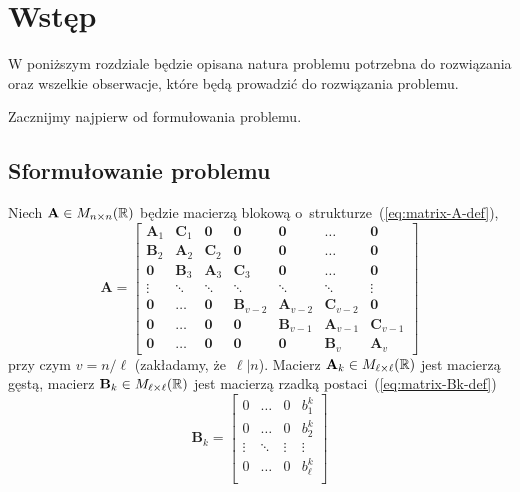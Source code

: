 \documentclass[../main.tex]{subfiles}
\newcommand{\Zero}{\mathbf{0}}
\newcommand{\AAA}{\mathbf{A}}
\newcommand{\BBB}{\mathbf{B}}
\newcommand{\CCC}{\mathbf{C}}
\begin{document}
  \chapter{Wstęp}
  W poniższym rozdziale będzie opisana natura problemu potrzebna do rozwiązania
  oraz wszelkie obserwacje, które będą prowadzić do rozwiązania problemu.
  
  Zacznijmy najpierw od formułowania problemu.
  \section{Sformułowanie problemu}
    Niech \( \AAA \in M_{n \times n}(\RR) \) będzie macierzą blokową
    o~strukturze~(\ref{eq:matrix-A-def}),
    \begin{equation} \label{eq:matrix-A-def}
      \AAA = \begin{bmatrix}
        \AAA_1 & \CCC_1 & \Zero  & \Zero      & \Zero       & \hdots      & \Zero       \\
        \BBB_2 & \AAA_2 & \CCC_2 & \Zero      & \Zero       & \hdots      & \Zero       \\
        \Zero  & \BBB_3 & \AAA_3 & \CCC_3     & \Zero       & \hdots      & \Zero       \\
        \vdots & \ddots & \ddots & \ddots     & \ddots      & \ddots      & \vdots      \\
        \Zero  & \hdots & \Zero  & \BBB_{v-2} & \AAA_{v-2}  & \CCC_{v-2}  & \Zero       \\
        \Zero  & \hdots & \Zero  & \Zero      & \BBB_{v-1}  & \AAA_{v-1}  & \CCC_{v-1}  \\
        \Zero  & \hdots & \Zero  & \Zero      & \Zero       & \BBB_v      & \AAA_v
      \end{bmatrix}
    \end{equation}
    przy czym \( v = n / \ell \) (zakładamy, że~\( \ell | n \)).
    Macierz \( \AAA_k \in M_{\ell \times \ell}(\RR) \) jest macierzą gęstą,
    macierz \( \BBB_k \in M_{\ell \times \ell}(\RR) \) jest macierzą rzadką
    postaci~(\ref{eq:matrix-Bk-def})
    \begin{equation} \label{eq:matrix-Bk-def}
      \BBB_k = \begin{bmatrix}
        0       & \hdots & 0      & b^k_1     \\
        0       & \hdots & 0      & b^k_2     \\
        \vdots  & \ddots & \vdots & \vdots    \\
        0       & \hdots & 0      & b^k_\ell  \\
      \end{bmatrix}
    \end{equation}
\end{document}
